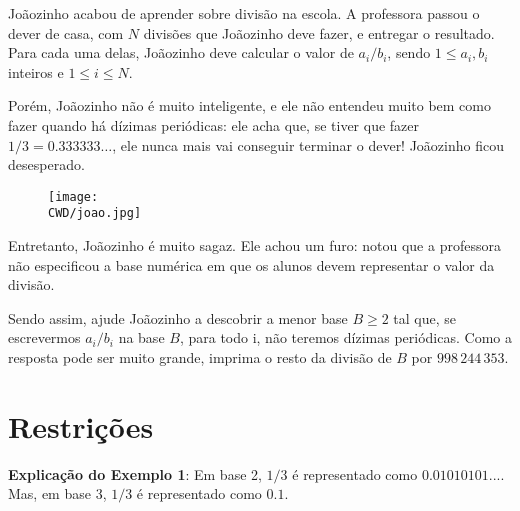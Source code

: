 %

Joãozinho acabou de aprender sobre divisão na escola. A professora passou o dever de casa, com $N$ divisões que Joãozinho deve fazer, e entregar o resultado. Para cada uma delas, Joãozinho deve calcular o valor de $a_i / b_i$, sendo $1 \leq a_i, b_i$ inteiros e $1 \leq i \leq N$.

Porém, Joãozinho não é muito inteligente, e ele não entendeu muito bem como fazer quando há dízimas periódicas: ele acha que, se tiver que fazer $1 / 3 = 0.333333\dots$, ele nunca mais vai conseguir terminar o dever! Joãozinho ficou desesperado.
\begin{figure}[H]
    \centering
    \texttt{[image: \\CWD/joao.jpg]}
\end{figure}
Entretanto, Joãozinho é muito sagaz. Ele achou um furo: notou que a professora não especificou a base numérica em que os alunos devem representar o valor da divisão.

Sendo assim, ajude Joãozinho a descobrir a menor base $B \geq 2$ tal que, se escrevermos $a_i / b_i$ na base $B$, para todo i, não teremos dízimas periódicas. Como a resposta pode ser muito grande, imprima o resto da divisão de $B$ por $998\,244\,353$.

%
%


%
%



\section*{Restrições}


\sampleio

\bigskip
\textbf{Explicação do Exemplo 1}: Em base 2, $1/3$ é representado como $0.01010101...$. Mas, em base 3, $1/3$ é representado como $0.1$.
